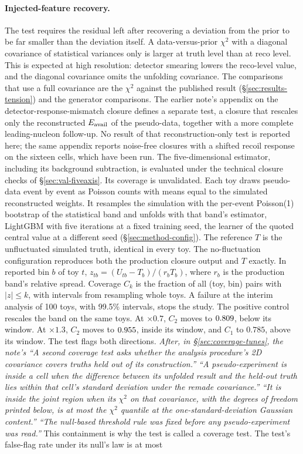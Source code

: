 \paragraph{Injected-feature recovery.} The test requires the residual left after recovering a deviation from the prior to be far smaller than the deviation itself. A data-versus-prior $\chi^2$ with a diagonal covariance of statistical variances only is larger at truth level than at reco level. This is expected at high resolution: detector smearing lowers the reco-level value, and the diagonal covariance omits the unfolding covariance. The comparisons that use a full covariance are the $\chi^2$ against the published result (\S\ref{sec:results-tension}) and the generator comparisons. The earlier note's appendix on the detector-response-mismatch closure defines a separate test, a closure that rescales only the reconstructed $E_{\mathrm{avail}}$ of the pseudo-data, together with a more complete leading-nucleon follow-up. No result of that reconstruction-only test is reported here; the same appendix reports noise-free closures with a shifted recoil response on the sixteen cells, which have been run. The five-dimensional estimator, including its background subtraction, is evaluated under the technical closure checks of \S\ref{sec:val-fiveaxis}. Its coverage is unvalidated. Each toy draws pseudo-data event by event as Poisson counts with means equal to the simulated reconstructed weights. It resamples the simulation with the per-event Poisson(1) bootstrap of the statistical band and unfolds with that band's estimator, LightGBM with five iterations at a fixed training seed, the learner of the quoted central value at a different seed (\S\ref{sec:method-config}). The reference $T$ is the unfluctuated simulated truth, identical in every toy. The no-fluctuation configuration reproduces both the production closure output and $T$ exactly. In reported bin $b$ of toy $t$, $z_{tb}=(U_{tb}-T_b)/(r_b T_b)$, where $r_b$ is the production band's relative spread. Coverage $C_k$ is the fraction of all (toy, bin) pairs with $|z|\le k$, with intervals from resampling whole toys. A failure at the interim analysis of 100 toys, with 99.5\% intervals, stops the study. The positive control rescales the band on the same toys. At $\times0.7$, $C_2$ moves to $0.809$, below its window. At $\times1.3$, $C_2$ moves to $0.955$, inside its window, and $C_1$ to $0.785$, above its window. The test flags both directions. \emph{After, in \S\ref{sec:coverage-tunes}, the note's ``A second coverage test asks whether the analysis procedure's 2D covariance covers truths held out of its construction.'' ``A pseudo-experiment is inside a cell when the difference between its unfolded result and the held-out truth lies within that cell's standard deviation under the remade covariance.'' ``It is inside the joint region when its $\chi^{2}$ on that covariance, with the degrees of freedom printed below, is at most the $\chi^{2}$ quantile at the one-standard-deviation Gaussian content.'' ``The null-based threshold rule was fixed before any pseudo-experiment was read.''} This containment is why the test is called a coverage test. The test's false-flag rate under its null's law is at most  
